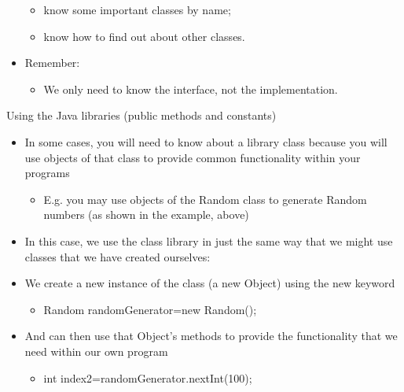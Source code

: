 \documentclass{beamer}
\begin{document}
\begin{frame}
\begin{itemize}
\begin{itemize}
\item know some important classes by name; 
\item know how to find out about other classes.
\end{itemize}
\item Remember:

\begin{itemize}
\item We only need to know the interface, not the implementation.
\end{itemize}
\end{itemize}

\end{frame} 
\begin{frame}

Using the Java libraries (public methods and constants)

\begin{itemize}
\item In some cases, you will need to know about a library class because you will use objects of that class to provide
common functionality within your programs

\begin{itemize}
\item E.g. you may use objects of the Random class to generate Random numbers (as shown in the example, above)
\end{itemize}
\item In this case, we use the class library in just the same way that we might use classes that we have created
ourselves:
\item We create a new instance of the class (a new Object) using the new keyword

\begin{itemize}
\item Random randomGenerator=new Random();
\end{itemize}
\item And can then use that Object's methods to provide the functionality that we need within our own program

\begin{itemize}
\item int index2=randomGenerator.nextInt(100);
\end{itemize}
\end{itemize}

 

\end{frame} 
\end{document}
